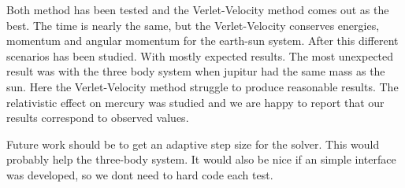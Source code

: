 Both method has been tested and the Verlet-Velocity method comes out as the best. The time is nearly the same, but the Verlet-Velocity conserves energies, momentum and angular momentum for the earth-sun system. After this different scenarios has been studied.  With mostly expected results. The most unexpected result was with the three body system when jupitur had the same mass as the sun. Here the Verlet-Velocity method struggle to produce reasonable results. The relativistic effect on mercury was studied and we are happy to report that our results correspond to observed values\cite{project3}.

Future work should be to get an adaptive step size for the solver. This would probably help the three-body system. It would also be nice if an simple interface was developed, so we dont need to hard code each test. 